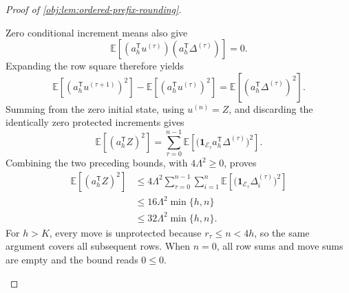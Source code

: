 \begin{proof}[Proof of \cref{obj:lem:ordered-prefix-rounding}]
\begin{enumerate}
Zero conditional increment means also give
\[
\mathbb E\!\left[
(a_h^{\mathsf T}u^{(\tau)})
(a_h^{\mathsf T}\Delta^{(\tau)})
\right]=0.
\]
Expanding the row square therefore yields
\[
\mathbb E[(a_h^{\mathsf T}u^{(\tau+1)})^2]
-
\mathbb E[(a_h^{\mathsf T}u^{(\tau)})^2]
=
\mathbb E[(a_h^{\mathsf T}\Delta^{(\tau)})^2].
\]
Summing from the zero initial state, using \(u^{(n)}=Z\), and discarding the identically zero protected increments gives
\[
\mathbb E[(a_h^{\mathsf T}Z)^2]
=
\sum_{\tau=0}^{n-1}
\mathbb E\!\left[
\bigl(\mathbf1_{\mathcal E_\tau}a_h^{\mathsf T}\Delta^{(\tau)}\bigr)^2
\right].
\]
Combining the two preceding bounds, with \(4\Lambda^2\geq0\), proves
\[
\begin{aligned}
\mathbb E[(a_h^{\mathsf T}Z)^2]
&\leq
4\Lambda^2
\sum_{\tau=0}^{n-1}\sum_{i=1}^n
\mathbb E\!\left[
\bigl(\mathbf1_{\mathcal E_\tau}\Delta_i^{(\tau)}\bigr)^2
\right]\\
&\leq16\Lambda^2\min\{h,n\}\\
&\leq32\Lambda^2\min\{h,n\}.
\end{aligned}
\]
For \(h>K\), every move is unprotected because \(r_\tau\leq n<4h\), so the same argument covers all subsequent rows. When \(n=0\), all row sums and move sums are empty and the bound reads \(0\leq0\).
\end{enumerate}
\end{proof}
